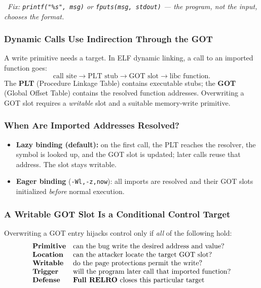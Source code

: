 \documentclass[hidelinks]{article}
\newcommand{\callout}[1]{\par\smallskip\noindent{\color{capri}$\blacktriangleright$}\ \textit{#1}\par\smallskip}
\begin{document}
\callout{Fix: \texttt{printf("\%s", msg)} or \texttt{fputs(msg, stdout)} --- the program, not the input, chooses the format.}

\subsubsection{Dynamic Calls Use Indirection Through the GOT}

A write primitive needs a target. In ELF dynamic linking, a call to an imported function goes:
\[
\text{call site} \to \text{PLT stub} \to \text{GOT slot} \to \text{libc function}.
\]
The \textbf{PLT} (Procedure Linkage Table) contains executable stubs; the \textbf{GOT} (Global Offset Table) contains the resolved function addresses. Overwriting a GOT slot requires a \emph{writable} slot and a suitable memory-write primitive.

\subsubsection{When Are Imported Addresses Resolved?}

\begin{itemize}
    \item \textbf{Lazy binding (default):} on the first call, the PLT reaches the resolver, the symbol is looked up, and the GOT slot is updated; later calls reuse that address. The slot stays writable.
    \item \textbf{Eager binding} (\texttt{-Wl,-z,now}): all imports are resolved and their GOT slots initialized \emph{before} normal execution.
\end{itemize}

\subsubsection{A Writable GOT Slot Is a Conditional Control Target}

Overwriting a GOT entry hijacks control only if \emph{all} of the following hold:
\[
\begin{array}{ll}
\textbf{Primitive} & \text{can the bug write the desired address and value?}\\
\textbf{Location}  & \text{can the attacker locate the target GOT slot?}\\
\textbf{Writable}  & \text{do the page protections permit the write?}\\
\textbf{Trigger}   & \text{will the program later call that imported function?}\\
\textbf{Defense}   & \text{\textbf{Full RELRO} closes this particular target}\\
\end{array}
\]
\end{document}
